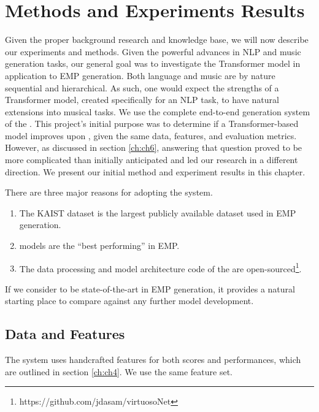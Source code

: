 \chapter{Methods and Experiments Results}\label{ch:ch5}
Given the proper background research and knowledge base, we will now describe our experiments and methods. Given the powerful advances in NLP and music generation tasks, our general goal was to investigate the Transformer model in application to EMP generation. Both language and music are by nature sequential and hierarchical. As such, one would expect the strengths of a Transformer model, created specifically for an NLP task, to have natural extensions into musical tasks. We use the complete end-to-end generation system of the \vnetf{}. This project's initial purpose was to determine if a Transformer-based model improves upon \vnet{}, given the same data, features, and evaluation metrics. However, as discussed in section \ref{ch:ch6}, answering that question proved to be more complicated than initially anticipated and led our research in a different direction. We present our initial method and experiment results in this chapter. 

There are three major reasons for adopting the \vnet{} system. 
\begin{enumerate}
    \item The KAIST dataset is the largest publicly available dataset used in EMP generation.
    \item \vnet{} models are the ``best performing'' in EMP.
    \item The data processing and model architecture code of the \vnetf{} are open-sourced\footnote{https://github.com/jdasam/virtuosoNet}.
\end{enumerate}
If we consider \vnet{} to be state-of-the-art in EMP generation, it provides a natural starting place to compare against any further model development. 

\section{Data and Features}
The \vnet{} system uses handcrafted features for both scores and performances, which are outlined in section \ref{ch:ch4}. We use the same feature set.

